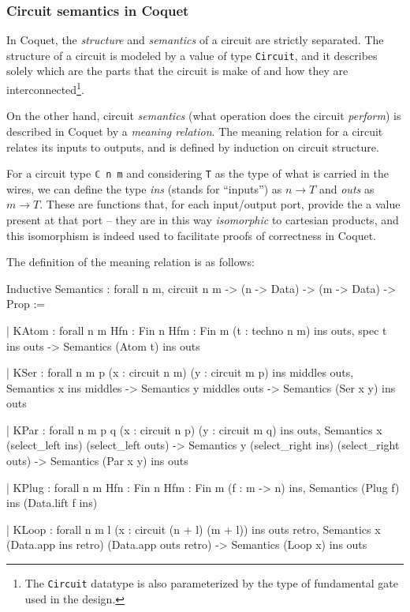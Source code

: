 \documentclass[a4paper]{article}
\begin{document}
            \subsubsection{Circuit semantics in Coquet}
            \label{subsubsec:coquet-semantics}
                In Coquet, the \emph{structure} and \emph{semantics} of a circuit are strictly
                separated. The structure of a circuit is modeled by a value of type
                \texttt{Circuit}, and it describes solely which are the parts that the circuit is
                make of and how they are interconnected\footnote{The \texttt{Circuit} datatype is
                    also parameterized by the type of fundamental gate used in the design.}.

                On the other hand, circuit \emph{semantics} (what operation does the circuit
                \emph{perform}) is described in Coquet by a \emph{meaning relation}. The meaning
                relation for a circuit relates its inputs to outputs, and is defined by induction on
                circuit structure.

                For a circuit type \texttt{ℂ n m} and considering \texttt{T} as the type of what is
                carried in the wires, we can define the type \emph{ins} (stands for ``inputs'') as
                $n \rightarrow T$ and \emph{outs} as $m \rightarrow T$. These are functions that,
                for each input/output port, provide the a value present at that port -- they are in
                this way \emph{isomorphic} to cartesian products, and this isomorphism is indeed
                used to facilitate proofs of correctness in Coquet.

                The definition of the meaning relation is as follows:

                \begin{coqcode}
        Inductive Semantics : forall {n} {m},
        circuit n m -> (n -> Data) -> (m -> Data) -> Prop :=

        | KAtom : forall n m {Hfn : Fin n} {Hfm : Fin m}
                      (t : techno n m) ins outs,
                          spec t ins outs -> Semantics (Atom t) ins outs

        | KSer : forall n m p (x : circuit n m) (y : circuit m p) ins middles outs,
                            Semantics x ins middles
                         -> Semantics y middles outs
                         -> Semantics (Ser x y) ins outs

        | KPar : forall n m p q (x : circuit n p) (y : circuit m q) ins outs,
                        Semantics x (select_left ins) (select_left outs)
                     -> Semantics y (select_right ins) (select_right outs)
                     -> Semantics (Par x y) ins outs

        | KPlug : forall n m {Hfn : Fin n} {Hfm : Fin m} (f : m -> n) ins,
                      Semantics (Plug f) ins (Data.lift f ins)

        | KLoop : forall n m l (x : circuit (n + l) (m + l)) ins outs retro,
                         Semantics x (Data.app ins retro) (Data.app outs retro)
                      -> Semantics (Loop x) ins outs
                \end{coqcode}
\end{document}
